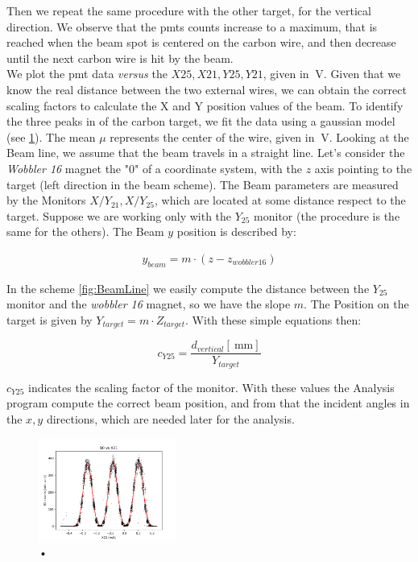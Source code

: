 { Then we repeat the same procedure with the other target, for the vertical direction. We observe that the pmts counts increase to a maximum, that is reached when the beam spot is centered on the carbon wire, and then decrease until the next carbon wire is hit by the beam.\\
We plot the pmt data \textit{versus} the $X25,X21,Y25,Y21$, given in $\SI{}{\volt}$. 
Given that we know the real distance between the two external wires, we can obtain the correct scaling factors to calculate the X and Y position values ​​of the beam. To identify the three peaks in of the carbon target, we fit the data using a gaussian model (see \ref{fig:HorizontalCalibration}). The mean $\mu$ represents the center of the wire, given in $\SI{}{\volt}$.
Looking at the Beam line, we assume that the beam travels in a straight line. Let's consider the \textit{Wobbler 16} magnet the "$0$" of a coordinate system, with the $z$ axis pointing to the target (left direction in the beam scheme). The Beam parameters are measured by the Monitors $X/Y_{21}, X/Y_{25}$, which are located at some distance respect to the target. Suppose we are working only with the $Y_{25}$ monitor (the procedure is the same for the others). The Beam $y$ position is described by:

\begin{align*}
y_{beam} = m \cdot (z - z_{wobbler 16})
\end{align*}

In the scheme \ref{fig:BeamLine} we easily compute the distance between the $Y_{25}$ monitor and the \textit{wobbler 16} magnet, so we have the slope $m$. The Position on the target is given by $Y_{target} = m \cdot Z_{target}$. With these simple equations then:

\begin{equation}
c_{Y25} = \dfrac{d_{vertical} [\SI{}{\milli \meter}]}{ Y_{target}} 
\end{equation}

$c_{Y25}$ indicates the scaling factor of the monitor. With these values the Analysis program compute the correct beam position, and from that the incident angles in the $x,y$ directions, which are needed later for the analysis.

\begin{figure}[hbtp]
\centering
\includegraphics[width=0.4\textwidth]{Analysis/HorizontalCalibration.png}
\caption{•}
\label{fig:HorizontalCalibration}
\end{figure}

}
